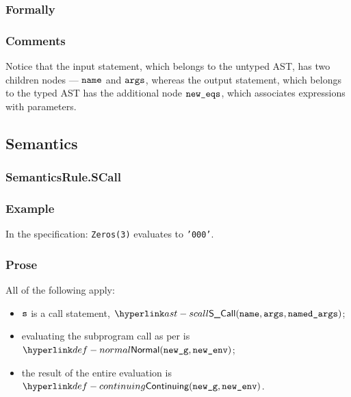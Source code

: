 \subsubsection{Formally}
\begin{mathpar}
\end{mathpar}

\subsubsection{Comments}
Notice that the input statement, which belongs to the untyped AST, has two children nodes ---
$\name$ and $\vargs$, whereas the output statement, which belongs to the typed AST has the additional
node $\neweqs$, which associates expressions with parameters.

\subsection{Semantics}
\subsubsection{SemanticsRule.SCall \label{sec:SemanticsRule.SCall}}
\subsubsection{Example}
In the specification:
\texttt{Zeros(3)} evaluates to \texttt{'000'}.

\subsubsection{Prose}
All of the following apply:
\begin{itemize}
  \item $\vs$ is a call statement, $\SCall(\name, \args, \namedargs)$;
  \item evaluating the subprogram call as per  is
  \\ $\Normal(\newg, \newenv)$\ProseOrAbnormal;
  \item the result of the entire evaluation is $\Continuing(\newg, \newenv)$.
\end{itemize}

